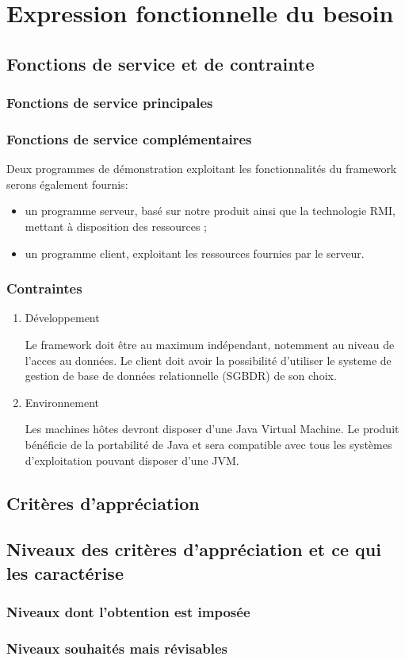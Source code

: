 \section{Expression fonctionnelle du besoin}

\subsection{Fonctions de service et de contrainte}
\subsubsection{Fonctions de service principales}
\subsubsection{Fonctions de service complémentaires}
Deux programmes de démonstration exploitant les fonctionnalités du framework serons également
fournis:
\begin{itemize}
 \item un programme serveur, basé sur notre produit ainsi que la technologie RMI, mettant à disposition des ressources ;
 \item un programme client, exploitant les ressources fournies par le serveur. 
\end{itemize}

\subsubsection{Contraintes}
\begin{enumerate}
 \item Développement

Le framework doit être au maximum indépendant, notemment au niveau de l'acces au données.
Le client doit avoir la possibilité d'utiliser le systeme de gestion de base de données relationnelle (SGBDR) de son choix.
 \item Environnement

Les machines hôtes devront disposer d'une Java Virtual Machine.
Le produit bénéficie de la portabilité de Java et sera compatible avec tous les systèmes
d'exploitation pouvant disposer d'une JVM.

\end{enumerate}

\subsection{Critères d’appréciation}

\subsection{Niveaux des critères d’appréciation et ce qui les caractérise}
\subsubsection{Niveaux dont l’obtention est imposée}
\subsubsection{Niveaux souhaités mais révisables}
